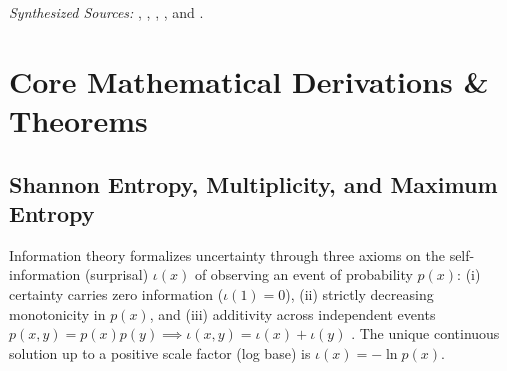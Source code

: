 \documentclass[../../../../master.tex]{subfiles}
\begin{document}
\begin{crossbook}
\begin{center}
\begin{tabularx}{\linewidth}{@{}l>{\raggedright\arraybackslash}X>{\raggedright\arraybackslash}X>{\raggedright\arraybackslash}X@{}}
\bottomrule
\end{tabularx}
\end{center}
\vspace{2pt}
\footnotesize\emph{Synthesized Sources:} , , , , and .
\end{crossbook}

\section{Core Mathematical Derivations \& Theorems}
\label{sec:infotheory:derivations}

\subsection{Shannon Entropy, Multiplicity, and Maximum Entropy}

Information theory formalizes uncertainty through three axioms on the self-information (surprisal) $\iota(x)$ of observing an event of probability $p(x)$: (i) certainty carries zero information ($\iota(1) = 0$), (ii) strictly decreasing monotonicity in $p(x)$, and (iii) additivity across independent events $p(x, y) = p(x)p(y) \implies \iota(x, y) = \iota(x) + \iota(y)$  . The unique continuous solution up to a positive scale factor (log base) is $\iota(x) = -\ln p(x)$.
\end{document}
